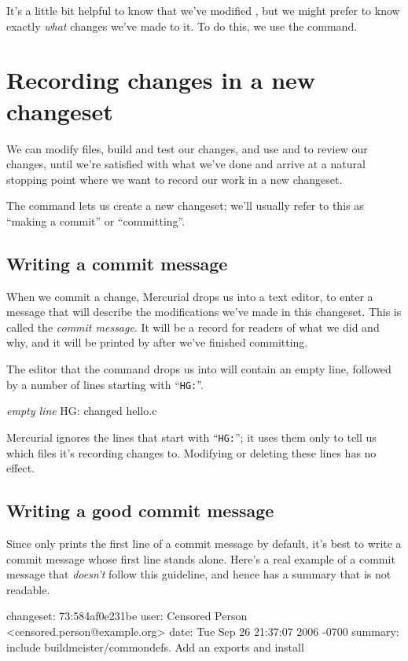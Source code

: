 It's a little bit helpful to know that we've modified
, but we might prefer to know exactly \emph{what}
changes we've made to it.  To do this, we use the 
command.

\section{Recording changes in a new changeset}

We can modify files, build and test our changes, and use
 and  to review our changes, until we're
satisfied with what we've done and arrive at a natural stopping point
where we want to record our work in a new changeset.

The  command lets us create a new changeset; we'll
usually refer to this as ``making a commit'' or ``committing''.  

\subsection{Writing a commit message}

When we commit a change, Mercurial drops us into a text editor, to
enter a message that will describe the modifications we've made in
this changeset.  This is called the \emph{commit message}.  It will be
a record for readers of what we did and why, and it will be printed by
 after we've finished committing.

The editor that the  command drops us into will contain
an empty line, followed by a number of lines starting with
``\texttt{HG:}''.
\begin{codesample2}
  \emph{empty line}
  HG: changed hello.c
\end{codesample2}
Mercurial ignores the lines that start with ``\texttt{HG:}''; it uses
them only to tell us which files it's recording changes to.  Modifying
or deleting these lines has no effect.

\subsection{Writing a good commit message}

Since  only prints the first line of a commit message by
default, it's best to write a commit message whose first line stands
alone.  Here's a real example of a commit message that \emph{doesn't}
follow this guideline, and hence has a summary that is not readable.
\begin{codesample2}
  changeset:   73:584af0e231be
  user:        Censored Person <censored.person@example.org>
  date:        Tue Sep 26 21:37:07 2006 -0700
  summary:     include buildmeister/commondefs.   Add an exports and install
\end{codesample2}

